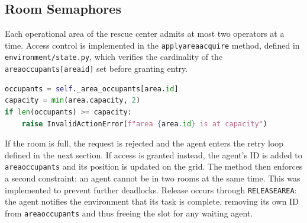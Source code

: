 \documentclass{article}
\renewcommand{\_}{\oldtextunderscore\allowbreak}
\begin{document}
\subsection{Room Semaphores}
Each operational area of the rescue center admits at most two operators at a 
time. Access control is implemented in the \texttt{\_apply\_area\_acquire} 
method, defined in \texttt{environment/state.py}, which verifies the 
cardinality of the \texttt{\_area\_occupants[area\_id]} set before granting 
entry.
\begin{lstlisting}[language=Python]
occupants = self._area_occupants[area.id]
capacity = min(area.capacity, 2)
if len(occupants) >= capacity:
    raise InvalidActionError(f"area {area.id} is at capacity")
\end{lstlisting}
If the room is full, the request is rejected and the agent enters the retry 
loop defined in the next section. If access is granted instead, the agent's 
ID is added to \texttt{\_area\_occupants} and its position is updated on the 
grid. The method then enforces a second constraint: an agent cannot be in two 
rooms at the same time. This was implemented to prevent further deadlocks. 
Release occurs through \texttt{RELEASE\_AREA}: the agent notifies the 
environment that its task is complete, removing its own ID from 
\texttt{\_area\_occupants} and thus freeing the slot for any waiting agent.
\end{document}
